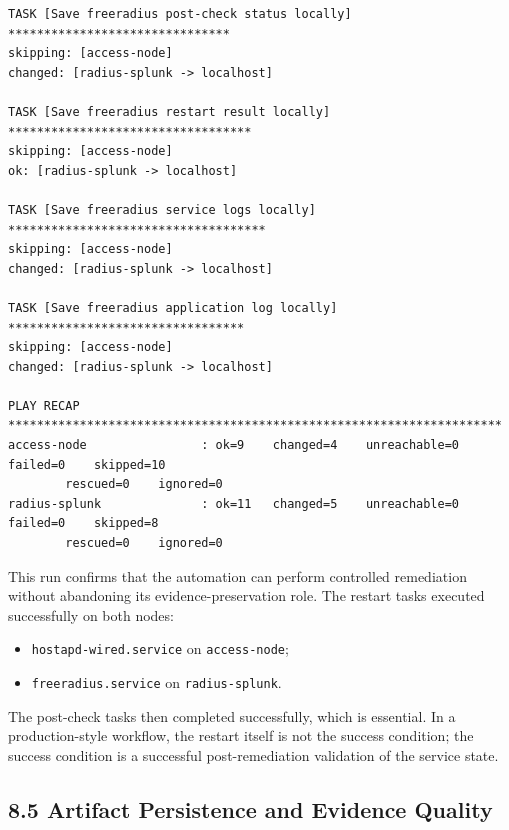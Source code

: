 \documentclass[11pt]{article}
\begin{document}
\begin{verbatim}
TASK [Save freeradius post-check status locally] *******************************
skipping: [access-node]
changed: [radius-splunk -> localhost]

TASK [Save freeradius restart result locally] **********************************
skipping: [access-node]
ok: [radius-splunk -> localhost]

TASK [Save freeradius service logs locally] ************************************
skipping: [access-node]
changed: [radius-splunk -> localhost]

TASK [Save freeradius application log locally] *********************************
skipping: [access-node]
changed: [radius-splunk -> localhost]

PLAY RECAP *********************************************************************
access-node                : ok=9    changed=4    unreachable=0    failed=0    skipped=10   
        rescued=0    ignored=0
radius-splunk              : ok=11   changed=5    unreachable=0    failed=0    skipped=8    
        rescued=0    ignored=0
\end{verbatim}

This run confirms that the automation can perform controlled remediation without abandoning its evidence-preservation role. The restart tasks executed successfully on both nodes:

\begin{itemize}
    \item \texttt{hostapd-wired.service} on \texttt{access-node};
    \item \texttt{freeradius.service} on \texttt{radius-splunk}.
\end{itemize}

The post-check tasks then completed successfully, which is essential. In a production-style workflow, the restart itself is not the success condition; the success condition is a successful post-remediation validation of the service state.


\subsection{8.5 Artifact Persistence and Evidence Quality}
\label{sec:artifact-persistence-and-evidence-quality}
\end{document}
